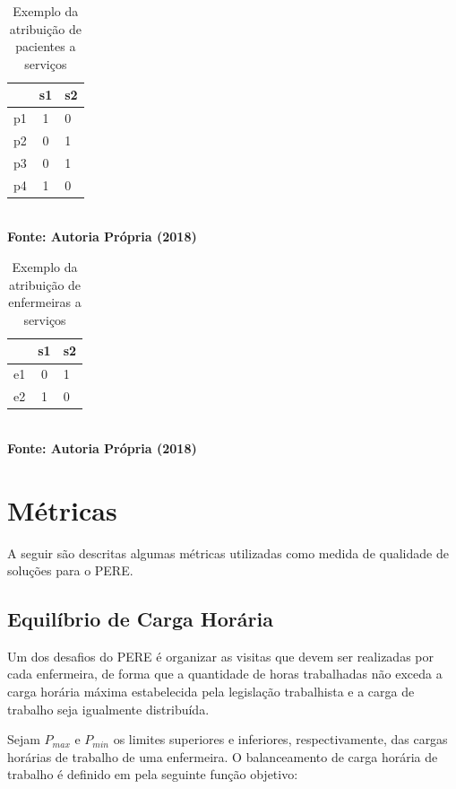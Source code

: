 \begin{table}[h]
\centering
\caption{Exemplo da atribuição de pacientes a serviços \label{paciente_serviço}}
\begin{tabular}{c|c|l}
   & s1 & s2	\\ \hline
p1 & 1  & 0     \\ \hline
p2 & 0  & 1      \\ \hline
p3 & 0  & 1     \\ \hline
p4 & 1  & 0     \\ \hline
\end{tabular}
{\footnotesize\\ \textbf{Fonte: Autoria Própria (2018)}}
\end{table}


\begin{table}[H]
\centering
\caption{Exemplo da atribuição de enfermeiras a serviços \label{enfermeira_serviço}}
\begin{tabular}{c|c|l}
   & s1 & s2 \\ \hline
e1 & 0  & 1   \\ \hline
e2 & 1  & 0   \\ \hline

\end{tabular}
{\footnotesize\\ \textbf{Fonte: Autoria Própria (2018)}}
\end{table}




\section{\esp Métricas }\label{pad}

A seguir são descritas algumas métricas utilizadas como medida de qualidade de soluções para o \ac{PERE}.

\subsection{Equilíbrio de Carga Horária}

Um dos desafios do \ac{PERE} é organizar as visitas que devem ser realizadas por cada enfermeira, de forma que a quantidade de horas trabalhadas não exceda a carga horária máxima estabelecida pela legislação trabalhista e a carga de trabalho seja igualmente distribuída.

Sejam $P_{max}$ e $P_{min}$ os limites superiores e inferiores, respectivamente, das cargas horárias de trabalho de uma enfermeira. O balanceamento de carga horária de trabalho é definido em  pela seguinte função objetivo: 

